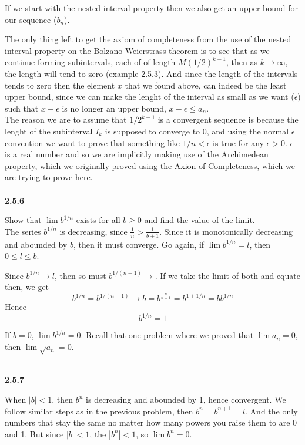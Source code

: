 If we start with the nested interval property then we also get an upper bound for our sequence ($b_n$).

The only thing left to get the axiom of completeness from the use of the nested interval property on the
Bolzano-Weierstrass theorem is to see that as we continue forming subintervals, each of of length
$M(1/2)^{k-1}$, then as $k\rightarrow\infty$, the length will tend to zero (example 2.5.3).
And since the length of the intervals tends to zero then the element $x$ that we found above, can indeed
be the least upper bound, since we can make the lenght of the interval as small as we want ($\epsilon$)
such that $x-\epsilon$ is no longer an upper bound, $x-\epsilon \leq a_n$.
\\

The reason we are to assume that $1/2^{k-1}$ is a convergent sequence is because the lenght of
the subinterval $I_k$ is supposed to converge to 0, and using the normal $\epsilon$ convention we want
to prove that something like $1/n < \epsilon$ is true for any $\epsilon > 0$.
$\epsilon$ is a real number and so we are implicitly making use of the Archimedean property, which
we originally proved using the Axion of Completeness, which we are trying to prove here.
\\~\\


\textbf{2.5.6}

Show that $\lim b^{1/n}$ exists for all $b\geq 0$ and find the value of the limit.
\\

The series $b^{1/n}$ is decreasing, since $\frac{1}{n} > \frac{1}{b+1}$.
Since it is monotonically decreasing and abounded by $b$, then it must converge.
Go again, if $\lim b^{1/n} = l$, then $0 \leq l \leq b$.

Since $b^{1/n} \rightarrow l$, then so must $b^{1/(n+1)} \rightarrow$.
If we take the limit of both and equate then, we get
$$
b^{1/n} = b^{1/(n+1)} \rightarrow b = b^{\frac{n}{n+1}} = b^{1 + 1/n} = bb^{1/n}
$$
Hence
$$
b^{1/n} = 1
$$

If $b=0$, $\lim b^{1/n} = 0$. Recall that one problem where we proved that $\lim a_n = 0$,
then $\lim \sqrt{a_n} = 0$.
\\~\\



\label{abbott:2.5.7}

\textbf{2.5.7}

When $|b| < 1$, then $b^n$ is decreasing and abounded by 1, hence convergent.
We follow similar steps as in the previous problem, then $b^n = b^{n+1} = l$.
And the only numbers that stay the same no matter how many powers you raise them to are
0 and 1. But since $|b| < 1$, the $|b^n| < 1$, so $\lim b^n = 0$.
\\~\\



